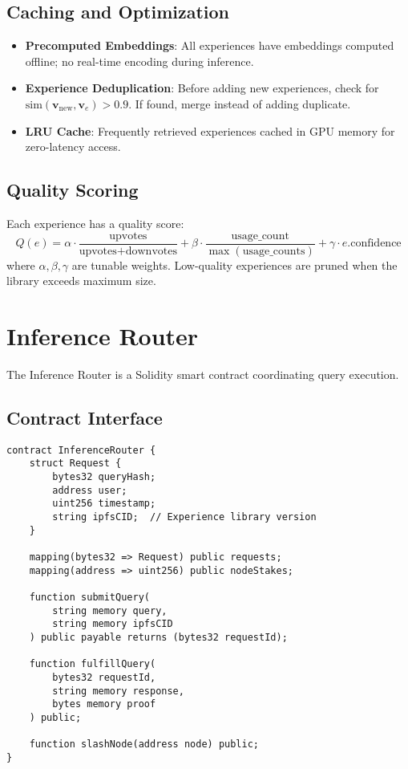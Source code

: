 \documentclass[11pt,a4paper]{article}
\begin{document}
\subsection{Caching and Optimization}

\begin{itemize}
\item \textbf{Precomputed Embeddings}: All experiences have embeddings computed offline; no real-time encoding during inference.
\item \textbf{Experience Deduplication}: Before adding new experiences, check for $\text{sim}(\mathbf{v}_{\text{new}}, \mathbf{v}_e) > 0.9$. If found, merge instead of adding duplicate.
\item \textbf{LRU Cache}: Frequently retrieved experiences cached in GPU memory for zero-latency access.
\end{itemize}

\subsection{Quality Scoring}

Each experience has a quality score:
\[
Q(e) = \alpha \cdot \frac{\text{upvotes}}{\text{upvotes} + \text{downvotes}} + \beta \cdot \frac{\text{usage\_count}}{\max(\text{usage\_counts})} + \gamma \cdot e.\text{confidence}
\]
where $\alpha, \beta, \gamma$ are tunable weights. Low-quality experiences are pruned when the library exceeds maximum size.

\section{Inference Router}

The Inference Router is a Solidity smart contract coordinating query execution.

\subsection{Contract Interface}

\begin{verbatim}
contract InferenceRouter {
    struct Request {
        bytes32 queryHash;
        address user;
        uint256 timestamp;
        string ipfsCID;  // Experience library version
    }

    mapping(bytes32 => Request) public requests;
    mapping(address => uint256) public nodeStakes;

    function submitQuery(
        string memory query,
        string memory ipfsCID
    ) public payable returns (bytes32 requestId);

    function fulfillQuery(
        bytes32 requestId,
        string memory response,
        bytes memory proof
    ) public;

    function slashNode(address node) public;
}
\end{verbatim}
\end{document}
